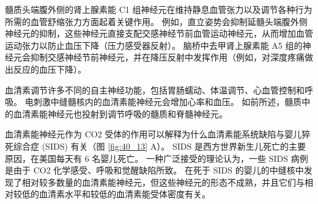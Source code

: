 髓质头端腹外侧的肾上腺素能 C1 组神经元在维持静息血管张力以及调节各种行为所需的血管舒缩张力方面起着关键作用。
例如，直立姿势会抑制延髓头端腹外侧神经元的抑制，这些神经元直接支配交感神经节前血管运动神经元，从而增加血管运动张力以防止血压下降（压力感受器反射）。
脑桥中去甲肾上腺素能 A5 组的神经元会抑制交感神经节前神经元，并在降压反射中发挥作用（例如，对深度疼痛做出反应的血压下降）。


血清素调节许多不同的自主神经功能，包括胃肠蠕动、体温调节、心血管控制和呼吸。
电刺激中缝髓核内的血清素能神经元会增加心率和血压。
如前所述，髓质中的血清素能神经元也投射到调节呼吸的髓质和脊髓神经元。


血清素能神经元作为 CO2 受体的作用可以解释为什么血清素能系统缺陷与婴儿猝死综合症 (SIDS) 有关（图 \ref{fig:40_13} A）。
SIDS 是西方世界新生儿死亡的主要原因，在美国每天有 6 名婴儿死亡。
一种广泛接受的理论认为，一些 SIDS 病例是由于 CO2 化学感受、呼吸和觉醒缺陷所致。
在死于 SIDS 的婴儿的中缝核中发现了相对较多数量的血清素能神经元，但这些神经元的形态不成熟，并且它们与相对较低的血清素水平和较低的血清素能受体密度有关。


